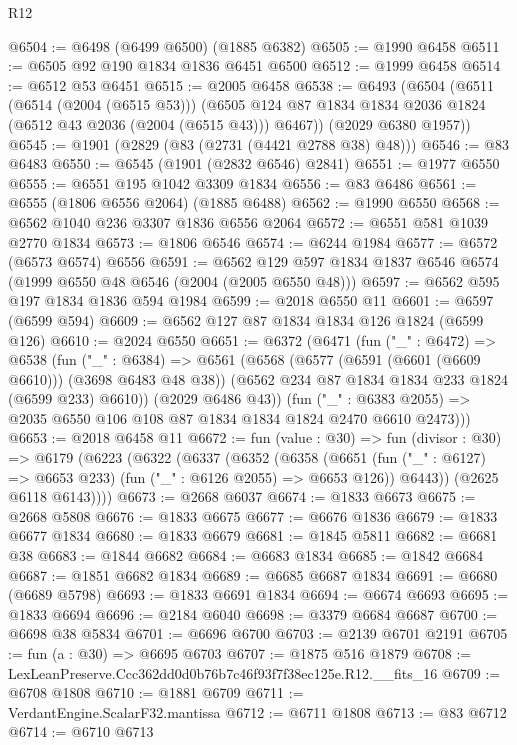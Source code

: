 \begin{lexlean}{R12}
\begin{coremodule}
@6504 := @6498 (@6499 @6500) (@1885 @6382)
@6505 := @1990 @6458
@6511 := @6505 @92 @190 @1834 @1836 @6451 @6500
@6512 := @1999 @6458
@6514 := @6512 @53 @6451
@6515 := @2005 @6458
@6538 := @6493
    (@6504
      (@6511
        (@6514 (@2004 (@6515 @53)))
        (@6505 @124 @87 @1834 @1834 @2036 @1824 (@6512 @43 @2036 (@2004 (@6515 @43))) @6467))
      (@2029 @6380 @1957))
@6545 := @1901 (@2829 (@83 (@2731 (@4421 @2788 @38) @48)))
@6546 := @83 @6483
@6550 := @6545 (@1901 (@2832 @6546) @2841)
@6551 := @1977 @6550
@6555 := @6551 @195 @1042 @3309 @1834
@6556 := @83 @6486
@6561 := @6555 (@1806 @6556 @2064) (@1885 @6488)
@6562 := @1990 @6550
@6568 := @6562 @1040 @236 @3307 @1836 @6556 @2064
@6572 := @6551 @581 @1039 @2770 @1834
@6573 := @1806 @6546
@6574 := @6244 @1984
@6577 := @6572 (@6573 @6574) @6556
@6591 := @6562 @129 @597 @1834 @1837 @6546 @6574 (@1999 @6550 @48 @6546 (@2004 (@2005 @6550 @48)))
@6597 := @6562 @595 @197 @1834 @1836 @594 @1984
@6599 := @2018 @6550 @11
@6601 := @6597 (@6599 @594)
@6609 := @6562 @127 @87 @1834 @1834 @126 @1824 (@6599 @126)
@6610 := @2024 @6550
@6651 := @6372
    (@6471
      (fun ("_" : @6472) =>
      @6538
        (fun ("_" : @6384) =>
        @6561
          (@6568
            (@6577 (@6591 (@6601 (@6609 @6610))) (@3698 @6483 @48 @38))
            (@6562 @234 @87 @1834 @1834 @233 @1824 (@6599 @233) @6610))
          (@2029 @6486 @43))
        (fun ("_" : @6383 @2055) => @2035 @6550 @106 @108 @87 @1834 @1834 @1824 @2470 @6610 @2473)))
@6653 := @2018 @6458 @11
@6672 := fun (value : @30) =>
  fun (divisor : @30) =>
  @6179
    (@6223
      (@6322
        (@6337
          (@6352
            (@6358
              (@6651 (fun ("_" : @6127) => @6653 @233) (fun ("_" : @6126 @2055) => @6653 @126))
              @6443))
          (@2625 @6118 @6143))))
@6673 := @2668 @6037
@6674 := @1833 @6673
@6675 := @2668 @5808
@6676 := @1833 @6675
@6677 := @6676 @1836
@6679 := @1833 @6677 @1834
@6680 := @1833 @6679
@6681 := @1845 @5811
@6682 := @6681 @38
@6683 := @1844 @6682
@6684 := @6683 @1834
@6685 := @1842 @6684
@6687 := @1851 @6682 @1834
@6689 := @6685 @6687 @1834
@6691 := @6680 (@6689 @5798)
@6693 := @1833 @6691 @1834
@6694 := @6674 @6693
@6695 := @1833 @6694
@6696 := @2184 @6040
@6698 := @3379 @6684 @6687
@6700 := @6698 @38 @5834
@6701 := @6696 @6700
@6703 := @2139 @6701 @2191
@6705 := fun (a : @30) => @6695 @6703
@6707 := @1875 @516 @1879
@6708 := LexLeanPreserve.Ccc362dd0d0b76b7c46f93f7f38ec125e.R12.__fits_16
@6709 := @6708 @1808
@6710 := @1881 @6709
@6711 := VerdantEngine.ScalarF32.mantissa
@6712 := @6711 @1808
@6713 := @83 @6712
@6714 := @6710 @6713

\end{coremodule}
\end{lexlean}
